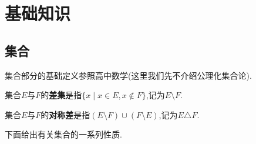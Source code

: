 \chapter{基础知识}

\section{集合}

集合部分的基础定义参照高中数学(这里我们先不介绍公理化集合论).

\begin{deff}
    集合$E$与$F$的\textbf{差集}是指$\{ x \mid x \in E, x \notin F \}$,记为$E \setminus F$.
\end{deff}

\begin{deff}
    集合$E$与$F$的\textbf{对称差}是指$(E \setminus F) \cup (F \setminus E)$,记为$E \triangle F$.
\end{deff}

下面给出有关集合的一系列性质.

